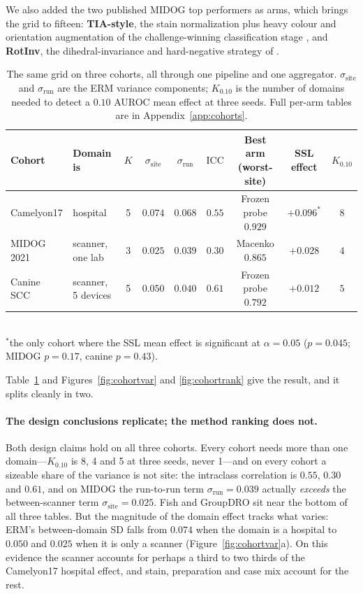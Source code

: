 \documentclass[10pt]{article} %
\begin{document}
We also added the two published MIDOG top performers as arms, which brings the
grid to fifteen: \textbf{TIA-style}, the stain normalization plus heavy colour
and orientation augmentation of the challenge-winning classification stage
\citep{jahanifar2024mitosis}, and \textbf{RotInv}, the dihedral-invariance and
hard-negative strategy of \citet{lafarge2021rotation}.

\begin{table}[t]
\centering
\caption{The same grid on three cohorts, all through one pipeline and one
aggregator. $\sigma_{\mathrm{site}}$ and $\sigma_{\mathrm{run}}$ are the ERM
variance components; $K_{0.10}$ is the number of domains needed to detect a
$0.10$ AUROC mean effect at three seeds. Full per-arm tables are in
Appendix~\ref{app:cohorts}.}
\label{tab:cohorts}
\small
\begin{tabular}{llccccccc}
\toprule
Cohort & Domain is & $K$ & $\sigma_{\mathrm{site}}$ & $\sigma_{\mathrm{run}}$
& $\mathrm{ICC}$ & Best arm (worst-site) & SSL effect & $K_{0.10}$ \\
\midrule
Camelyon17 & hospital           & 5 & $0.074$ & $0.068$ & $0.55$ & Frozen probe $0.929$ & $+0.096^{*}$ & $8$ \\
MIDOG 2021 & scanner, one lab   & 3 & $\mathbf{0.025}$ & $0.039$ & $0.30$ & Macenko $0.865$      & $+0.028$ & $4$ \\
Canine SCC & scanner, 5 devices & 5 & $0.050$ & $0.040$ & $0.61$ & Frozen probe $0.792$ & $+0.012$ & $5$ \\
\bottomrule
\end{tabular}
\\[2pt]
{\footnotesize $^{*}$the only cohort where the SSL mean effect is significant
at $\alpha=0.05$ ($p=0.045$; MIDOG $p=0.17$, canine $p=0.43$).}
\end{table}

Table~\ref{tab:cohorts} and Figures~\ref{fig:cohortvar} and
\ref{fig:cohortrank} give the result, and it splits cleanly in two.

\paragraph{The design conclusions replicate; the method ranking does not.}
Both design claims hold on all three cohorts. Every cohort needs more
than one domain---$K_{0.10}$ is 8, 4 and 5 at three seeds, never 1---and on
every cohort a sizeable share of the variance is not site: the intraclass
correlation is $0.55$, $0.30$ and $0.61$, and on MIDOG the run-to-run term
$\sigma_{\mathrm{run}}=0.039$ actually \emph{exceeds} the between-scanner term
$\sigma_{\mathrm{site}}=0.025$. Fish and GroupDRO sit near the bottom of all
three tables. But the magnitude of the domain effect tracks what varies: ERM's
between-domain SD falls from $0.074$ when the domain is a hospital to $0.050$
and $0.025$ when it is only a scanner (Figure~\ref{fig:cohortvar}a). On this
evidence the scanner accounts for perhaps a third to two thirds of the
Camelyon17 hospital effect, and stain, preparation and case mix account for the
rest.
\end{document}
